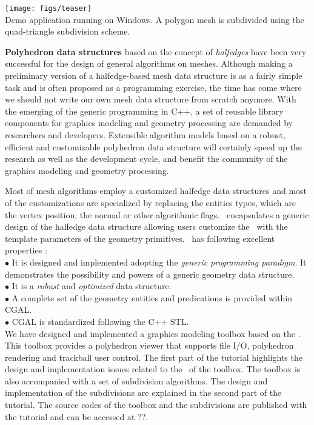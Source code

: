 \documentclass[letter]{article}
\begin{document}
\begin{center} 
  \texttt{[image: figs/teaser]}\\
{\scriptsize Demo application running on Windows. A polygon mesh is 
   subdivided using the quad-triangle subdivision scheme.}

\end{center}

\textbf{Polyhedron data structures} based on the concept of
\emph{halfedges} have been very successful for the design
of general algorithms on meshes. 
Although making a preliminary version of a halfedge-based mesh data
structure is as a fairly simple task and is often proposed as a
programming exercise, the time has come where we should not write our
own mesh data structure from scratch anymore. With the emerging of
the generic programming in C++, a set of reusable library
components for graphics modeling and geometry processing are demanded
by researchers and developers. Extensible algorithm models based on
a robust, efficient and customizable polyhedron 
data structure will certainly speed up
the research as well as the development cycle, and benefit the 
community of the graphics modeling and geometry processing.  

Most of mesh algorithms employ a customized 
halfedge data structures and most of the customizations 
are specialized by replacing the entities types, 
which are the vertex position, the normal or other 
algorithmic flags. \cgalpoly\ encapsulates a generic
design of the halfedge data structure allowing users
customize the \poly\ with the template parameters of
the geometry primitives. 
\cgalpoly\ has following excellent properties :\\
\indent $\bullet$ It is designed and implemented adopting the
\emph{generic programming paradigm}. It demonstrates the possibility
and powers of a generic geometry data structure.\\
\indent $\bullet$ It is a \emph{robust} and \emph{optimized} data structure.\\
\indent $\bullet$ A complete set of the geometry entities and predications 
is provided within CGAL.\\
\indent $\bullet$ CGAL is standardized following the C++ STL.\\

We have designed and implemented a graphics modeling toolbox
based on the \cgalpoly . This toolbox provides a
polyhedron viewer that supports file I/O, polyhedron 
rendering and trackball user control. The first part of the 
tutorial highlights the design and implementation issues 
related to the \cgalpoly\ of the toolbox.
The toolbox is also accompanied with a set of 
subdivision algorithms. The design and implementation of the 
subdivisions are explained in the second part of the tutorial.
The source codes of the toolbox and the subdivisions are 
published with the tutorial and can be 
accessed at ??.
\end{document}
